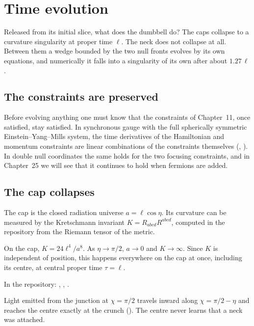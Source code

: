 \chapter{Time evolution}\label{ch:evolution}

\begin{questionbox}
Released from its initial slice, what does the dumbbell do? The caps collapse to a curvature singularity at proper time $\ell$. The neck does not collapse at all. Between them a wedge bounded by the two null fronts evolves by its own equations, and numerically it falls into a singularity of its own after about $1.27\,\ell$.
\end{questionbox}

\section{The constraints are preserved}

Before evolving anything one must know that the constraints of Chapter~11, once satisfied, stay satisfied. In synchronous gauge with the full spherically symmetric Einstein--Yang--Mills system, the time derivatives of the Hamiltonian and momentum constraints are linear combinations of the constraints themselves (, ). In double null coordinates the same holds for the two focusing constraints, and in Chapter~25 we will see that it continues to hold when fermions are added.

\section{The cap collapses}

The cap is the closed radiation universe $a=\ell\cos\eta$. Its curvature can be measured by the Kretschmann invariant $K=R_{abcd}R^{abcd}$, computed in the repository from the Riemann tensor of the metric.

\begin{theorem}\proved
On the cap, $K=24\ell^4/a^8$. As $\eta\to\pi/2$, $a\to0$ and $K\to\infty$. Since $K$ is independent of position, this happens everywhere on the cap at once, including its centre, at central proper time $\tau=\ell$.
\end{theorem}
\noindent In the repository: , , .

Light emitted from the junction at $\chi=\pi/2$ travels inward along $\chi=\pi/2-\eta$ and reaches the centre exactly at the crunch (). The centre never learns that a neck was attached.

